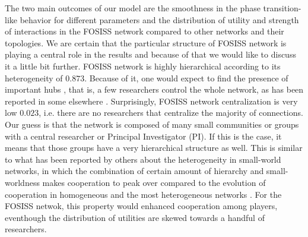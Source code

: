 \documentclass{bmcart}
\begin{document}
The two main outcomes of our model are the smoothness in the phase
transition-like behavior for different parameters and the distribution of
utility and strength of interactions in the FOSISS network compared to other
networks and their topologies. We are certain that the particular structure of
FOSISS network is playing a central role in the results and because of that we
would like to discuss it a little bit further. FOSISS network is highly
hierarchical according to its heterogeneity of $0.873$. Because of it, one would
expect to find the presence of important hubs \cite{Wu:2008}, that is, a few
researchers control the whole network, as has been reported in some elsewhere
\cite{Yousefi-etal:2008}. Surprisingly, FOSISS network centralization is very
low $0.023$, i.e. there are no researchers that centralize the majority of
connections. Our guess is that the network is composed of many small communities
or groups with a central researcher or Principal Investigator (PI). If this is
the case, it means that those groups have a very hierarchical structure as
well. This is similar to what has been reported by others about the
heterogeneity in small-world networks, in which the combination of certain
amount of hierarchy and small-worldness makes cooperation to peak over compared
to the evolution of cooperation in homogeneous and the most heterogeneous
networks \cite{Fu:2007}. For the FOSISS netwok, this property would enhanced
cooperation among players, eventhough the distribution of utilities are skewed
towards a handful of researchers. \\ 


\end{document}

